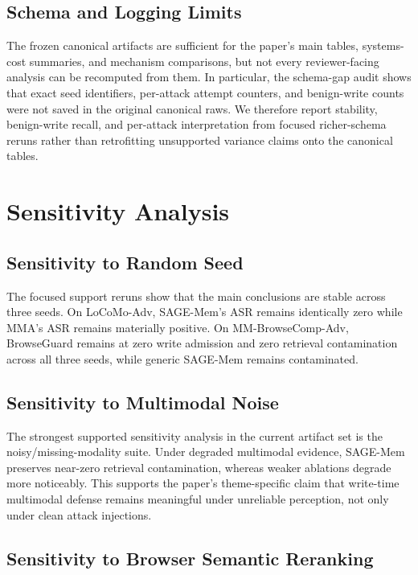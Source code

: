 \documentclass{article}
\begin{document}
\subsection{Schema and Logging Limits}

The frozen canonical artifacts are sufficient for the paper's main tables, systems-cost summaries, and mechanism comparisons, but not every reviewer-facing analysis can be recomputed from them. In particular, the schema-gap audit shows that exact seed identifiers, per-attack attempt counters, and benign-write counts were not saved in the original canonical raws. We therefore report stability, benign-write recall, and per-attack interpretation from focused richer-schema reruns rather than retrofitting unsupported variance claims onto the canonical tables.

\section{Sensitivity Analysis}
\label{sec:appendix-sensitivity}

\subsection{Sensitivity to Random Seed}

The focused support reruns show that the main conclusions are stable across three seeds. On LoCoMo-Adv, SAGE-Mem's ASR remains identically zero while MMA's ASR remains materially positive. On MM-BrowseComp-Adv, BrowseGuard remains at zero write admission and zero retrieval contamination across all three seeds, while generic SAGE-Mem remains contaminated.

\subsection{Sensitivity to Multimodal Noise}

The strongest supported sensitivity analysis in the current artifact set is the noisy/missing-modality suite. Under degraded multimodal evidence, SAGE-Mem preserves near-zero retrieval contamination, whereas weaker ablations degrade more noticeably. This supports the paper's theme-specific claim that write-time multimodal defense remains meaningful under unreliable perception, not only under clean attack injections.

\subsection{Sensitivity to Browser Semantic Reranking}
\end{document}

